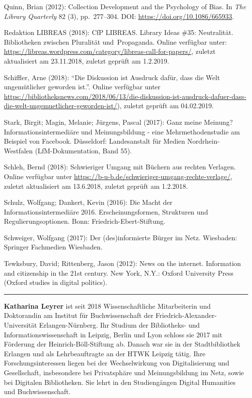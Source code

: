\documentclass[a4paper,
fontsize=11pt,
oneside,
numbers=noperiodatend,
parskip=half-,
bibliography=totoc,
final
]{scrartcl}
\begin{document}
Quinn, Brian (2012): Collection Development and the Psychology of Bias.
In \emph{The Library Quarterly} 82 (3), pp.~277--304. DOI:
\url{https://doi.org/10.1086/665933}.

Redaktion LIBREAS (2018): CfP LIBREAS. Library Ideas \#35: Neutralität.
Bibliotheken zwischen Pluralität und~Propaganda. Online verfügbar unter:
\url{https://libreas.wordpress.com/category/libreas-call-for-papers/},
zuletzt aktualisiert am 23.11.2018, zuletzt geprüft am 1.2.2019.

Schiffler, Arne (2018): \enquote{Die Diskussion ist Ausdruck dafür, dass
die Welt ungemütlicher geworden ist.}. Online verfügbar unter
\url{https://bibliotheksnews.com/2018/06/13/die-diskussion-ist-ausdruck-dafuer-dass-die-welt-ungemuetlicher-geworden-ist/}),
zuletzt geprüft am 04.02.2019.

Stark, Birgit; Magin, Melanie; Jürgens, Pascal (2017): Ganz meine
Meinung? Informationsintermediäre und Meinungsbildung - eine
Mehrmethodenstudie am Beispiel von Facebook. Düsseldorf: Landesanstalt
für Medien Nordrhein-Westfalen (LfM-Dokumentation, Band 55).

Schleh, Bernd (2018): Schwieriger Umgang mit Büchern aus rechten
Verlagen. Online verfügbar unter
\url{https://b-u-b.de/schwieriger-umgang-rechte-verlage/}, zuletzt
aktualisiert am 13.6.2018, zuletzt geprüft am 1.2.2018.

Schulz, Wolfgang; Dankert, Kevin (2016): Die Macht der
Informationsintermediäre 2016. Erscheinungsformen, Strukturen und
Regulierungsoptionen. Bonn: Friedrich-Ebert-Stiftung.

Schweiger, Wolfgang (2017): Der (des)informierte Bürger im Netz.
Wiesbaden: Springer Fachmedien Wiesbaden.

Tewksbury, David; Rittenberg, Jason (2012): News on the internet.
Information and citizenship in the 21st century. New York, N.Y.: Oxford
University Press (Oxford studies in digital politics).

\begin{center}\rule{0.5\linewidth}{\linethickness}\end{center}

\textbf{Katharina Leyrer} ist seit 2018 Wissenschaftliche Mitarbeiterin und
Doktorandin am Institut für Buchwissenschaft der Friedrich-Alexander-Universität
Erlangen-Nürnberg. Ihr Studium der Bibliotheks- und Informationswissenschaft in
Leipzig, Berlin und Lyon schloss sie 2017 mit Förderung der
Heinrich-Böll-Stiftung ab. Danach war sie in der Stadtbibliothek Erlangen und
als Lehrbeauftragte an der HTWK Leipzig tätig. Ihre Forschungsinteressen liegen
bei der Wechselwirkung von Digitalisierung und Gesellschaft, insbesondere bei
Privatsphäre und Meinungsbildung im Netz, sowie bei Digitalen Bibliotheken. Sie
lehrt in den Studiengängen Digital Humanities und Buchwissenschaft.
\end{document}

